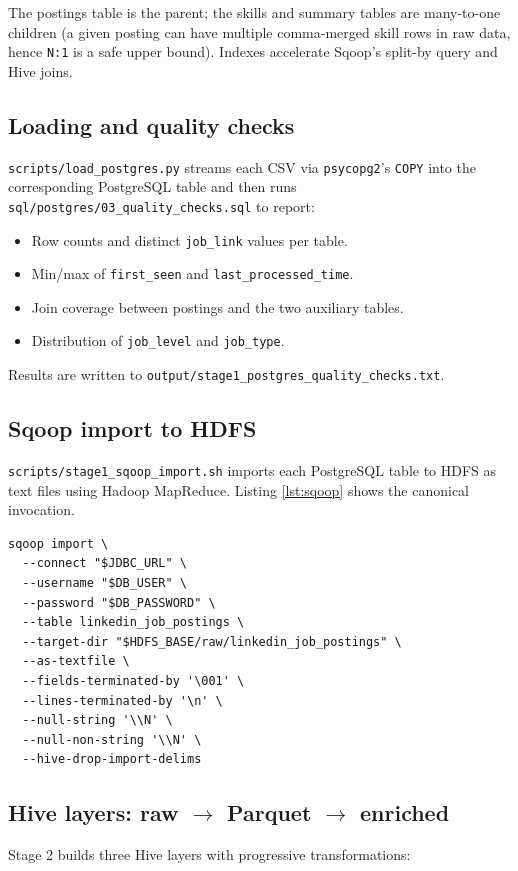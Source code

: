 \documentclass[11pt,a4paper]{article}
\begin{document}
The postings table is the parent; the skills and summary tables are
many-to-one children (a given posting can have multiple comma-merged
skill rows in raw data, hence \texttt{N:1} is a safe upper bound).
Indexes accelerate Sqoop's split-by query and Hive joins.

\subsection{Loading and quality checks}
\texttt{scripts/load\_postgres.py} streams each CSV via
\texttt{psycopg2}'s \texttt{COPY} into the corresponding PostgreSQL
table and then runs \texttt{sql/postgres/03\_quality\_checks.sql} to
report:

\begin{itemize}[leftmargin=*]
  \item Row counts and distinct \texttt{job\_link} values per table.
  \item Min/max of \texttt{first\_seen} and \texttt{last\_processed\_time}.
  \item Join coverage between postings and the two auxiliary tables.
  \item Distribution of \texttt{job\_level} and \texttt{job\_type}.
\end{itemize}

Results are written to
\texttt{output/stage1\_postgres\_quality\_checks.txt}.

\subsection{Sqoop import to HDFS}
\texttt{scripts/stage1\_sqoop\_import.sh} imports each PostgreSQL
table to HDFS as text files using Hadoop MapReduce.  Listing
\ref{lst:sqoop} shows the canonical invocation.

\begin{lstlisting}[style=bash,caption={Sqoop import of one of the
three PostgreSQL tables.},label={lst:sqoop}]
sqoop import \
  --connect "$JDBC_URL" \
  --username "$DB_USER" \
  --password "$DB_PASSWORD" \
  --table linkedin_job_postings \
  --target-dir "$HDFS_BASE/raw/linkedin_job_postings" \
  --as-textfile \
  --fields-terminated-by '\001' \
  --lines-terminated-by '\n' \
  --null-string '\\N' \
  --null-non-string '\\N' \
  --hive-drop-import-delims
\end{lstlisting}

\subsection{Hive layers: raw $\rightarrow$ Parquet $\rightarrow$ enriched}
Stage 2 builds three Hive layers with progressive transformations:
\end{document}
